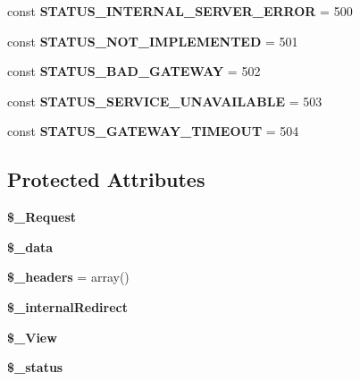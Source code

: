 \begin{DoxyCompactItemize}
\item 
\hypertarget{classResponse_a222b9eb91cceea575a93d986320055cc}{
const {\bfseries STATUS\_\-INTERNAL\_\-SERVER\_\-ERROR} = 500}
\label{classResponse_a222b9eb91cceea575a93d986320055cc}

\item 
\hypertarget{classResponse_a9245cc3681dfe11560cce071157f145a}{
const {\bfseries STATUS\_\-NOT\_\-IMPLEMENTED} = 501}
\label{classResponse_a9245cc3681dfe11560cce071157f145a}

\item 
\hypertarget{classResponse_a781b18b57603aa8200304c3b9fdc2f47}{
const {\bfseries STATUS\_\-BAD\_\-GATEWAY} = 502}
\label{classResponse_a781b18b57603aa8200304c3b9fdc2f47}

\item 
\hypertarget{classResponse_a40a409f209fd4988a404ee8d9bdeb41a}{
const {\bfseries STATUS\_\-SERVICE\_\-UNAVAILABLE} = 503}
\label{classResponse_a40a409f209fd4988a404ee8d9bdeb41a}

\item 
\hypertarget{classResponse_a631961ea6752ed944f84a3ce8796781b}{
const {\bfseries STATUS\_\-GATEWAY\_\-TIMEOUT} = 504}
\label{classResponse_a631961ea6752ed944f84a3ce8796781b}

\end{DoxyCompactItemize}
\subsection*{Protected Attributes}
\begin{DoxyCompactItemize}
\item 
\hypertarget{classResponse_aafda453f4de1b5633e6ef8b6d030ff6c}{
{\bfseries \$\_\-Request}}
\label{classResponse_aafda453f4de1b5633e6ef8b6d030ff6c}

\item 
\hypertarget{classResponse_a75e54e1efc790425d2569a4d0cc53b2c}{
{\bfseries \$\_\-data}}
\label{classResponse_a75e54e1efc790425d2569a4d0cc53b2c}

\item 
\hypertarget{classResponse_addb9138dcbc2c3d6ae35b037b11347eb}{
{\bfseries \$\_\-headers} = array()}
\label{classResponse_addb9138dcbc2c3d6ae35b037b11347eb}

\item 
\hypertarget{classResponse_af4ee6bd9b641e23b3decfa0a30984ad1}{
{\bfseries \$\_\-internalRedirect}}
\label{classResponse_af4ee6bd9b641e23b3decfa0a30984ad1}

\item 
\hypertarget{classResponse_a77099aff672d68b84d44220b62ba0169}{
{\bfseries \$\_\-View}}
\label{classResponse_a77099aff672d68b84d44220b62ba0169}

\item 
\hypertarget{classResponse_ad760d82e45408d8c003624ba7601b2e9}{
{\bfseries \$\_\-status}}
\label{classResponse_ad760d82e45408d8c003624ba7601b2e9}

\end{DoxyCompactItemize}
